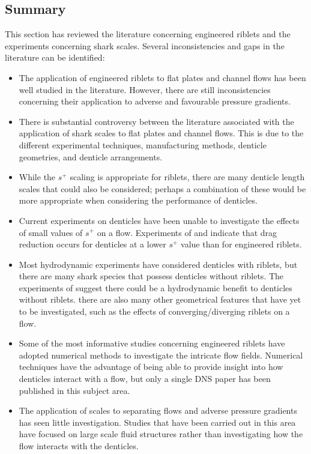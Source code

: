 \documentclass[12pt,oneside,a4paper]{article}
\begin{document}
\subsection{Summary}
This section has reviewed the literature concerning engineered riblets and the experiments concerning shark scales. Several inconsistencies and gaps in the literature can be identified:
\begin{itemize}
%
\itemsep0em
\item The application of engineered riblets to flat plates and channel flows has been well studied in the literature. However, there are still inconsistencies concerning their application to adverse and favourable pressure gradients. 
%
\item There is substantial controversy between the literature associated with the application of shark scales to flat plates and channel flows. This is due to the different experimental techniques, manufacturing methods, denticle geometries, and denticle arrangements.
%
\item While the $s^+$ scaling is appropriate for riblets, there are many denticle length scales that could also be considered; perhaps a combination of these would be more appropriate when considering the performance of denticles. 
%
\item Current experiments on denticles have been unable to investigate the effects of small values of $s^+$ on a flow. Experiments of \cite{bechert1985} and \cite{wen2014,wen2015} indicate that drag reduction occurs for denticles at a lower $s^+$ value than for engineered riblets.
%
\item Most hydrodynamic experiments have considered denticles with riblets, but there are many shark species that possess denticles without riblets. The experiments of \cite{fletcher2014phd} suggest there could be a hydrodynamic benefit to denticles without riblets. there are also many other geometrical features that have yet to be investigated, such as the effects of converging/diverging riblets on a flow. 
%
\item Some of the most informative studies concerning engineered riblets have adopted numerical methods to investigate the intricate flow fields. Numerical techniques have the advantage of being able to provide insight into how denticles interact with a flow, but only a single DNS paper has been published in this subject area. 
%
\item The application of scales to separating flows and adverse pressure gradients has seen little investigation. Studies that have been carried out in this area have focused on large scale fluid structures rather than investigating how the flow interacts with the denticles.

\end{itemize}
\end{document}
